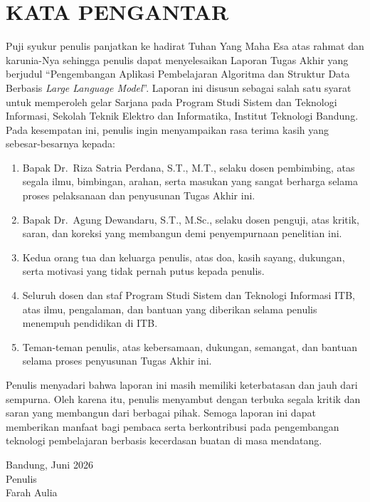 \chapter*{KATA PENGANTAR}

Puji syukur penulis panjatkan ke hadirat Tuhan Yang Maha Esa atas rahmat dan karunia-Nya sehingga penulis dapat menyelesaikan Laporan Tugas Akhir yang berjudul ``Pengembangan Aplikasi Pembelajaran Algoritma dan Struktur Data Berbasis \textit{Large Language Model}''. Laporan ini disusun sebagai salah satu syarat untuk memperoleh gelar Sarjana pada Program Studi Sistem dan Teknologi Informasi, Sekolah Teknik Elektro dan Informatika, Institut Teknologi Bandung. Pada kesempatan ini, penulis ingin menyampaikan rasa terima kasih yang sebesar-besarnya kepada:

\begin{enumerate}
    \item Bapak Dr.\ Riza Satria Perdana, S.T., M.T., selaku dosen pembimbing, atas segala ilmu, bimbingan, arahan, serta masukan yang sangat berharga selama proses pelaksanaan dan penyusunan Tugas Akhir ini.

    \item Bapak Dr.\ Agung Dewandaru, S.T., M.Sc., selaku dosen penguji, atas kritik, saran, dan koreksi yang membangun demi penyempurnaan penelitian ini.

    \item Kedua orang tua dan keluarga penulis, atas doa, kasih sayang, dukungan, serta motivasi yang tidak pernah putus kepada penulis.

    \item Seluruh dosen dan staf Program Studi Sistem dan Teknologi Informasi ITB, atas ilmu, pengalaman, dan bantuan yang diberikan selama penulis menempuh pendidikan di ITB.

    \item Teman-teman penulis, atas kebersamaan, dukungan, semangat, dan bantuan selama proses penyusunan Tugas Akhir ini.
\end{enumerate}

Penulis menyadari bahwa laporan ini masih memiliki keterbatasan dan jauh dari sempurna. Oleh karena itu, penulis menyambut dengan terbuka segala kritik dan saran yang membangun dari berbagai pihak. Semoga laporan ini dapat memberikan manfaat bagi pembaca serta berkontribusi pada pengembangan teknologi pembelajaran berbasis kecerdasan buatan di masa mendatang.

\begin{flushright}
    Bandung, Juni 2026\\
    \vspace{1cm}
    Penulis \\
    \vspace{0.8cm}
    Farah Aulia
\end{flushright}
